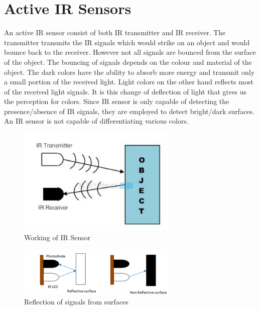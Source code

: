 \section{Active IR Sensors}
An active IR sensor consist of both IR transmitter and IR receiver. The transmitter transmits the IR signals which would strike on an object and would bounce back to the receiver. However not all signals are bounced from the surface of the object. The bouncing of signals depends on the colour and material of the object. The dark colors have the ability to absorb more energy and transmit only a small portion of the received light. Light colors on the other hand reflects most of the received light signals. It is this change of deflection of light that gives us the perception for colors. Since IR sensor is only capable of detecting the presence/absence of IR signals, they are employed to detect bright/dark surfaces. An IR sensor is not capable of differentiating various colors.\\
\vspace{1cm}
\hspace{2cm}
\begin{figure}[h!]	
	\centering
	\includegraphics[width=3in]{Chapters/images/IR_working_single.png}
	\caption{Working of IR Sensor}
\end{figure}
\hspace{2cm}
\begin{figure}[h!]	
	\centering
	\includegraphics[width=3in]{Chapters/images/IR_working_dual.png}
	\caption{Reflection of signals from surfaces}
\end{figure}
